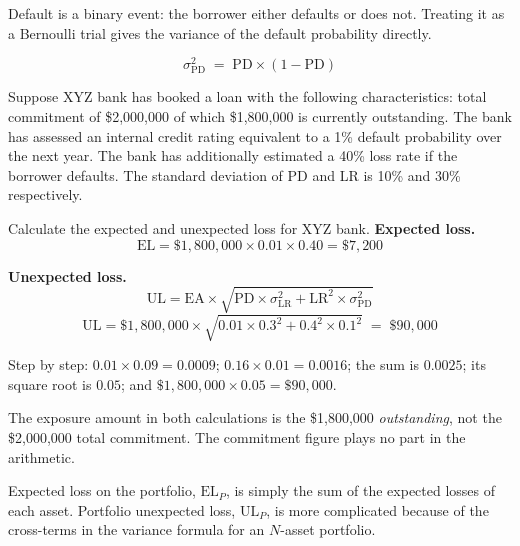 Default is a binary event: the borrower either defaults or does not. Treating it
as a Bernoulli trial gives the variance of the default probability directly.

\begin{crfmlbox}
\[ \sigma^{2}_{\mathrm{PD}} \;=\; \mathrm{PD} \times (1-\mathrm{PD}) \]
\end{crfmlbox}

\begin{crexbox}
Suppose XYZ bank has booked a loan with the following characteristics: total
commitment of \$2,000,000 of which \$1,800,000 is currently outstanding. The bank
has assessed an internal credit rating equivalent to a 1\% default probability
over the next year. The bank has additionally estimated a 40\% loss rate if the
borrower defaults. The standard deviation of PD and LR is 10\% and 30\%
respectively.

Calculate the expected and unexpected loss for XYZ bank.
\tcblower
\textbf{Expected loss.}
\[ \mathrm{EL} = \$1{,}800{,}000 \times 0.01 \times 0.40 = \$7{,}200 \]

\textbf{Unexpected loss.}
\[ \mathrm{UL} = \mathrm{EA}\times\sqrt{\mathrm{PD}\times\sigma^{2}_{\mathrm{LR}}
   + \mathrm{LR}^{2}\times\sigma^{2}_{\mathrm{PD}}} \]
\[ \mathrm{UL} = \$1{,}800{,}000 \times \sqrt{0.01\times 0.3^{2} + 0.4^{2}\times 0.1^{2}}
   \;=\; \$90{,}000 \]

Step by step: $0.01\times0.09 = 0.0009$; $0.16\times0.01 = 0.0016$; the sum is
$0.0025$; its square root is $0.05$; and $\$1{,}800{,}000 \times 0.05 = \$90{,}000$.
\end{crexbox}

\begin{crtrapbox}
The exposure amount in both calculations is the \$1,800,000 \emph{outstanding},
not the \$2,000,000 total commitment. The commitment figure plays no part in the
arithmetic.
\end{crtrapbox}


Expected loss on the portfolio, $\mathrm{EL}_P$, is simply the sum of the
expected losses of each asset. Portfolio unexpected loss, $\mathrm{UL}_P$, is
more complicated because of the cross-terms in the variance formula for an
$N$-asset portfolio.

